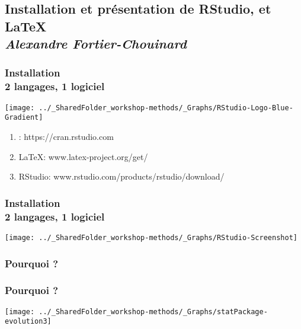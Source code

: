 \documentclass{beamer}
\begin{document}
    
\subsection{Installation et présentation de RStudio, \R et \LaTeX \\ \small\emph{Alexandre Fortier-Chouinard}}

   \begin{frame}
            \frametitle{Installation \\ \vspace{0.2cm} 2 langages, 1 logiciel}
            \vspace{0.5cm}
            \begin{center}
              \texttt{[image: ../\_SharedFolder\_workshop-methods/\_Graphs/RStudio-Logo-Blue-Gradient]}
            \end{center} 
            \begin{enumerate}
                \item<2-> \R: https://cran.rstudio.com
                \item<3-> \LaTeX: www.latex-project.org/get/
                \item<4-> RStudio: www.rstudio.com/products/rstudio/download/
            \end{enumerate}
    \end{frame}
    
    \begin{frame}
            \frametitle{Installation \\ \vspace{0.2cm} 2 langages, 1 logiciel}
            \vspace{2.3cm}
            \begin{center}
              \texttt{[image: ../\_SharedFolder\_workshop-methods/\_Graphs/RStudio-Screenshot]}
            \end{center} 
    \end{frame}






    \begin{frame}
        \frametitle{Pourquoi \R?}  \vspace{1.2cm}
    \end{frame}

    \begin{frame}
        \frametitle{Pourquoi \R?}  \vspace{1.2cm}
        \begin{center}
            \texttt{[image: ../\_SharedFolder\_workshop-methods/\_Graphs/statPackage-evolution3]}
        \end{center} 
    \end{frame}
    
\end{document}
